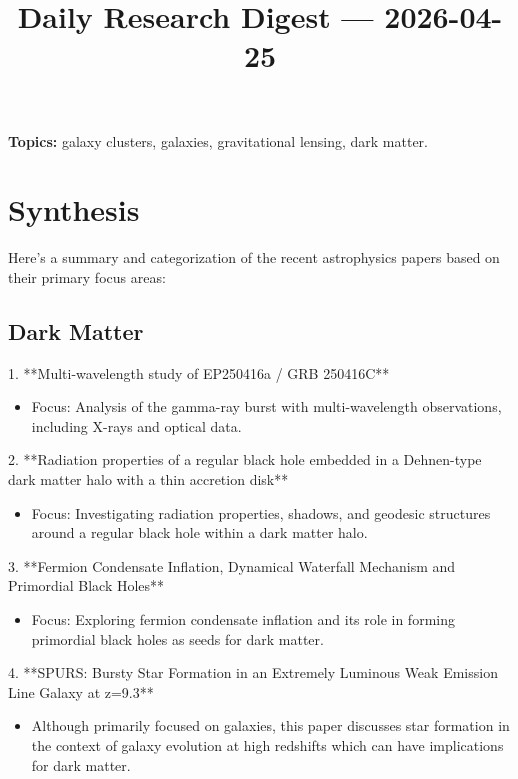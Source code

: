 \documentclass[11pt]{article}
\begin{document}
\title{Daily Research Digest --- 2026-04-25}
\author{}
\date{}
\maketitle
\textbf{Topics:} galaxy clusters, galaxies, gravitational lensing, dark matter.
\section*{Synthesis}
Here's a summary and categorization of the recent astrophysics papers based on their primary focus areas:
\subsection*{Dark Matter}
1. **Multi-wavelength study of EP250416a / GRB 250416C**
\begin{itemize}
\item Focus: Analysis of the gamma-ray burst with multi-wavelength observations, including X-rays and optical data.
\end{itemize}
2. **Radiation properties of a regular black hole embedded in a Dehnen-type dark matter halo with a thin accretion disk**
\begin{itemize}
\item Focus: Investigating radiation properties, shadows, and geodesic structures around a regular black hole within a dark matter halo.
\end{itemize}
3. **Fermion Condensate Inflation, Dynamical Waterfall Mechanism and Primordial Black Holes**
\begin{itemize}
\item Focus: Exploring fermion condensate inflation and its role in forming primordial black holes as seeds for dark matter.
\end{itemize}
4. **SPURS: Bursty Star Formation in an Extremely Luminous Weak Emission Line Galaxy at z=9.3**
\begin{itemize}
\item Although primarily focused on galaxies, this paper discusses star formation in the context of galaxy evolution at high redshifts which can have implications for dark matter.
\end{itemize}
\end{document}

